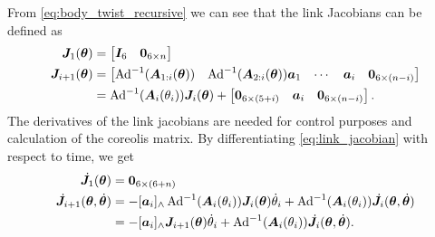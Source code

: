 From \autoref{eq:body_twist_recursive} we can see that the link Jacobians can be
defined as
\begin{subequations}
    \label{eq:link_jacobian}
\begin{align}
    \bm{J}_1(\bm{\theta}) &= \begin{bmatrix} \bm{I}_6 & \bm{0}_{6 \times n} \end{bmatrix} \\
        \bm{J}_{i+1}(\bm{\theta}) &= \begin{bmatrix}
            \operatorname{Ad}^{-1}(\bm{A}_{1:i}(\bm{\theta}))  &  \operatorname{Ad}^{-1}(\bm{A}_{2:i}(\bm{\theta})) \bm{a}_1 &
            \cdots & \bm{a}_i & \bm{0}_{6 \times (n-i)}
        \end{bmatrix} \\
    &= \operatorname{Ad}^{-1}(\bm{A}_i(\theta_i)) \bm{J}_i(\bm{\theta}) + \begin{bmatrix}
        \bm{0}_{6 \times (5+i)} & \bm{a}_i & \bm{0}_{6 \times (n-i)}
    \end{bmatrix}.
\end{align}
\end{subequations}
The derivatives of the link jacobians are needed for control purposes and
calculation of the coreolis matrix. By differentiating \autoref{eq:link_jacobian}
with respect to time, we get
\begin{subequations}
\begin{align}
    \dot{\bm{J}}_1(\bm{\theta}) &= \bm{0}_{6\times(6+n)} \\
    \dot{\bm{J}}_{i+1}(\bm{\theta},\dot{\bm{\theta}}) &= -[\bm{a}_i]_{\wedge} \operatorname{Ad}^{-1}(\bm{A}_i(\theta_i))
        \bm{J}_i(\bm{\theta})\dot{\theta}_i + \operatorname{Ad}^{-1}(\bm{A}_i(\theta_i))\dot{\bm{J}}_i(\bm{\theta},\dot{\bm{\theta}}) \\
    &= -[\bm{a}_i]_{\wedge}\bm{J}_{i+1}(\bm{\theta})\dot{\theta}_i +
        \operatorname{Ad}^{-1}(\bm{A}_i(\theta_i))\dot{\bm{J}}_i(\bm{\theta},\dot{\bm{\theta}}).
\end{align}
\end{subequations}

